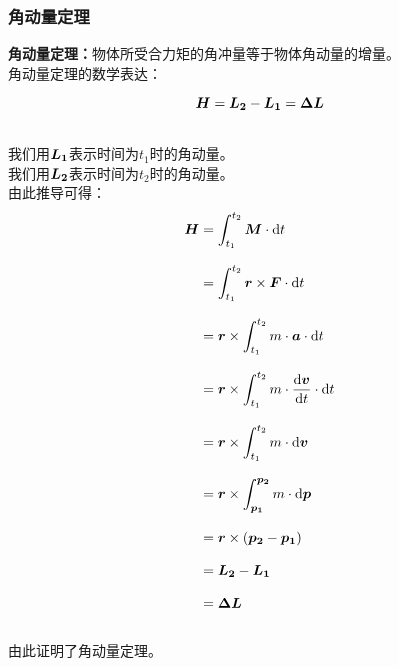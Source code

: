 \documentclass[UTF8]{ctexart}
\newcommand*{\veb}[1]{\vb*{#1}}
\newcommand*{\dif}{\mathop{}\!\mathrm{d}}
\begin{document}
\subsubsection{角动量定理}
    \textbf{角动量定理：}物体所受合力矩的角冲量等于物体角动量的增量。\\[3mm]
    角动量定理的数学表达：
    \begin{large}
        \begin{equation*}
            \veb{H}=\veb{L_2}-\veb{L_1}=\veb{\Delta L}
        \end{equation*}
    \end{large}\\
    我们用$\veb{L_1}$表示时间为$t_1$时的角动量。\\[3mm]
    我们用$\veb{L_2}$表示时间为$t_2$时的角动量。\\[3mm]
    由此推导可得：
    \setcounter{equation}{0}
    \begin{align}
        \veb{H}
        &=\int_{t_1}^{t_2}\veb{M}\cdot\dif t\\[3mm]
        &=\int_{t_1}^{t_2}\veb{r}\times\veb{F}\cdot\dif t\\[3mm]
        &=\veb{r}\times\int_{t_1}^{t_2}m\cdot\veb{a}\cdot\dif t\\[3mm]
        &=\veb{r}\times\int_{t_1}^{t_2}m\cdot\frac{\dif\veb{v}}{\dif t}\cdot\dif t\\[3mm]
        &=\veb{r}\times\int_{t_1}^{t_2}m\cdot\dif\veb{v}\\[3mm]
        &=\veb{r}\times\int_{\veb{p_1}}^{\veb{p_2}}m\cdot\dif\veb{p}\\[3mm]
        &=\veb{r}\times(\veb{p_2}-\veb{p_1})\\[3mm]
        &=\veb{L_2}-\veb{L_1}\\[3mm]
        &=\veb{\Delta L}
    \end{align}\\
    由此证明了角动量定理。

\newpage
\end{document}

